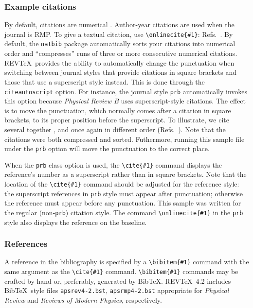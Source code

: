 \documentclass[%
 preprint, linenumbers,
 amsmath,amssymb,
 aps, physrev,
]{revtex4-2}
\begin{document}
\subsubsection{Example citations}
By default, citations are numerical \cite{Beutler1994}.
Author-year citations are used when the journal is RMP. 
To give a textual citation, use \verb+\onlinecite{#1}+: 
Refs.~. 
By default, the \texttt{natbib} package automatically sorts your citations into numerical order and ``compresses'' runs of three or more consecutive numerical citations.
REV\TeX\ provides the ability to automatically change the punctuation when switching between journal styles that provide citations in square brackets and those that use a superscript style instead. This is done through the \texttt{citeautoscript} option. For instance, the journal style \texttt{prb} automatically invokes this option because \textit{Physical 
Review B} uses superscript-style citations. The effect is to move the punctuation, which normally comes after a citation in square brackets, to its proper position before the superscript. 
To illustrate, we cite several together 
\cite{[See the explanation of time travel in ]feyn54,*[The classical relativistic treatment of ][ is a relative classic]epr,witten2001,Berman1983,Davies1998,Bire82}, 
and once again in different order (Refs.~\cite{epr,feyn54,Bire82,Berman1983,witten2001,Davies1998}). 
Note that the citations were both compressed and sorted. Futhermore, running this sample file under the \texttt{prb} option will move the punctuation to the correct place.

When the \verb+prb+ class option is used, the \verb+\cite{#1}+ command
displays the reference's number as a superscript rather than in
square brackets. Note that the location of the \verb+\cite{#1}+
command should be adjusted for the reference style: the superscript
references in \verb+prb+ style must appear after punctuation;
otherwise the reference must appear before any punctuation. This
sample was written for the regular (non-\texttt{prb}) citation style.
The command \verb+\onlinecite{#1}+ in the \texttt{prb} style also
displays the reference on the baseline.

\subsubsection{References}
A reference in the bibliography is specified by a \verb+\bibitem{#1}+ command
with the same argument as the \verb+\cite{#1}+ command.
\verb+\bibitem{#1}+ commands may be crafted by hand or, preferably,
generated by Bib\TeX. 
REV\TeX~4.2 includes Bib\TeX\ style files
\verb+apsrev4-2.bst+, \verb+apsrmp4-2.bst+ appropriate for
\textit{Physical Review} and \textit{Reviews of Modern Physics},
respectively.
\end{document}
